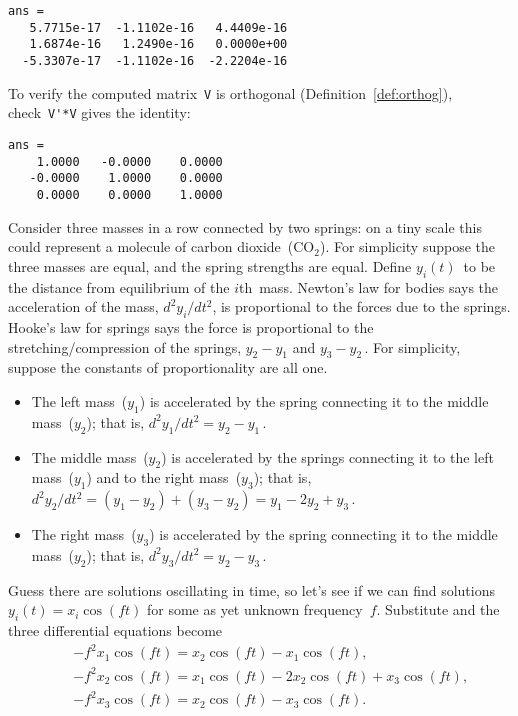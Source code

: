 \begin{example}
\begin{solution}
\begin{verbatim}
ans =
   5.7715e-17  -1.1102e-16   4.4409e-16
   1.6874e-16   1.2490e-16   0.0000e+00
  -5.3307e-17  -1.1102e-16  -2.2204e-16
\end{verbatim}
To verify the computed matrix~\verb|V| is orthogonal (Definition~\ref{def:orthog}), check~\verb|V'*V| gives the identity:
\begin{verbatim}
ans =
    1.0000   -0.0000    0.0000
   -0.0000    1.0000    0.0000
    0.0000    0.0000    1.0000
\end{verbatim}
\end{solution}
\end{example}


\begin{example} \label{eg:eig3vib}
Consider three masses in a row connected by two springs: on a tiny scale this could represent a molecule of carbon dioxide~(\(\text{CO}_2\)).
For simplicity suppose the three masses are equal, and the spring strengths are equal.
Define \(y_i(t)\)~to be the distance from equilibrium of the \(i\)th~mass.
Newton's law for bodies says the acceleration of the mass, \(d^2y_i/dt^2\), is proportional to the forces due to the springs.
Hooke's law for springs says the force is proportional to the stretching\slash compression of the springs, \(y_2-y_1\) and \(y_3-y_2\)\,.
For simplicity, suppose the constants of proportionality are all one.
\begin{itemize}
\item The left mass~(\(y_1\)) is accelerated by the spring connecting it to the middle mass~(\(y_2\)); that is, \(d^2y_1/dt^2=y_2-y_1\)\,.
\item The middle mass~(\(y_2\)) is accelerated by the springs connecting it to the left mass~(\(y_1\)) and to the right mass~(\(y_3\)); that is, \(d^2y_2/dt^2=(y_1-y_2)+(y_3-y_2)=y_1-2y_2+y_3\)\,.
\item The right mass~(\(y_3\)) is accelerated by the spring connecting it to the middle mass~(\(y_2\)); that is, \(d^2y_3/dt^2=y_2-y_3\)\,.
\end{itemize}
Guess there are solutions oscillating in time, so let's see if we can find solutions \(y_i(t)=x_i\cos(ft)\) for some as yet unknown frequency~\(f\).
Substitute and the three differential equations become
\begin{eqnarray*}
&&-f^2x_1\cos(ft)=x_2\cos(ft)-x_1\cos(ft),
\\&&-f^2x_2\cos(ft)=x_1\cos(ft)-2x_2\cos(ft)+x_3\cos(ft),
\\&&-f^2x_3\cos(ft)=x_2\cos(ft)-x_3\cos(ft).

\end{eqnarray*}
\end{example}
